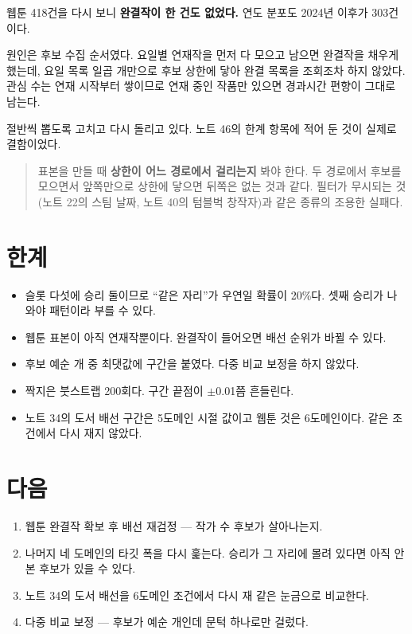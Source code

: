 \documentclass[10pt]{article}
\begin{document}
웹툰 418건을 다시 보니 \textbf{완결작이 한 건도 없었다.} 연도 분포도
2024년 이후가 303건이다.

원인은 후보 수집 순서였다. 요일별 연재작을 먼저 다 모으고 남으면 완결작을
채우게 했는데, 요일 목록 일곱 개만으로 후보 상한에 닿아 완결 목록을 조회조차
하지 않았다. 관심 수는 연재 시작부터 쌓이므로 연재 중인 작품만 있으면 경과시간
편향이 그대로 남는다.

절반씩 뽑도록 고치고 다시 돌리고 있다. 노트 46의 한계 항목에 적어 둔 것이
실제로 결함이었다.

\begin{quote}\fontsize{9.5}{11.5}\selectfont
표본을 만들 때 \textbf{상한이 어느 경로에서 걸리는지} 봐야 한다. 두 경로에서
후보를 모으면서 앞쪽만으로 상한에 닿으면 뒤쪽은 없는 것과 같다. 필터가 무시되는
것(노트 22의 스팀 날짜, 노트 40의 텀블벅 창작자)과 같은 종류의 조용한 실패다.
\end{quote}

\section{한계}

\begin{itemize}[leftmargin=1.1em,itemsep=0.15em]
\item 슬롯 다섯에 승리 둘이므로 ``같은 자리''가 우연일 확률이 20\%다. 셋째
      승리가 나와야 패턴이라 부를 수 있다.
\item 웹툰 표본이 아직 연재작뿐이다. 완결작이 들어오면 배선 순위가 바뀔 수 있다.
\item 후보 예순 개 중 최댓값에 구간을 붙였다. 다중 비교 보정을 하지 않았다.
\item 짝지은 붓스트랩 200회다. 구간 끝점이 $\pm$0.01쯤 흔들린다.
\item 노트 34의 도서 배선 구간은 5도메인 시절 값이고 웹툰 것은 6도메인이다.
      같은 조건에서 다시 재지 않았다.
\end{itemize}

\section{다음}

\begin{enumerate}[leftmargin=1.3em,itemsep=0.15em]
\item 웹툰 완결작 확보 후 배선 재검정 --- 작가 수 후보가 살아나는지.
\item 나머지 네 도메인의 타깃 폭을 다시 훑는다. 승리가 그 자리에 몰려 있다면
      아직 안 본 후보가 있을 수 있다.
\item 노트 34의 도서 배선을 6도메인 조건에서 다시 재 같은 눈금으로 비교한다.
\item 다중 비교 보정 --- 후보가 예순 개인데 문턱 하나로만 걸렀다.
\end{enumerate}
\end{document}
